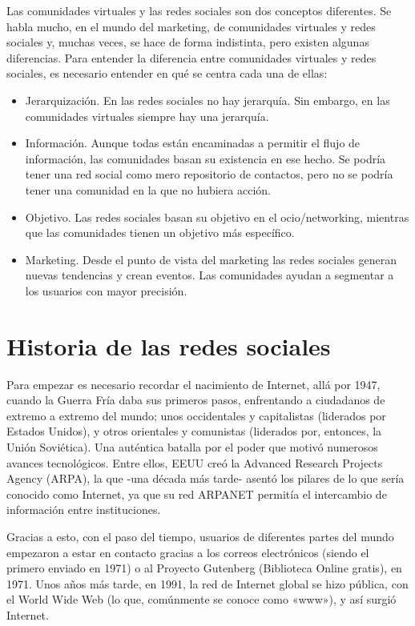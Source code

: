 Las comunidades virtuales y las redes sociales son dos conceptos diferentes. Se habla mucho, en el mundo del marketing, de comunidades virtuales y redes sociales y, muchas veces, se hace de forma indistinta, pero existen algunas diferencias. Para entender la diferencia entre comunidades virtuales y redes sociales,  es necesario entender en qué se centra cada una de ellas:
\begin{itemize}
    \item Jerarquización. En las redes sociales no hay jerarquía. Sin embargo, en las comunidades virtuales siempre hay una jerarquía.
    \item Información. Aunque todas están encaminadas a permitir el flujo de información, las comunidades basan su existencia en ese hecho. Se podría tener una red social como mero repositorio de contactos, pero no se podría tener una comunidad en la que no hubiera acción.
    \item Objetivo. Las redes sociales basan su objetivo en el ocio/networking, mientras que las comunidades tienen un objetivo más específico.
    \item Marketing. Desde el punto de vista del marketing las redes sociales generan nuevas tendencias y crean eventos. Las comunidades ayudan a segmentar a los usuarios con mayor precisión.
\end{itemize}

\section{Historia de las redes sociales}

Para empezar es necesario recordar el nacimiento de Internet, allá por 1947, cuando la Guerra Fría daba sus primeros pasos, enfrentando a ciudadanos de extremo a extremo del mundo; unos occidentales y capitalistas (liderados por Estados Unidos), y otros orientales y comunistas (liderados por, entonces, la Unión Soviética). Una auténtica batalla por el poder que motivó numerosos avances tecnológicos. Entre ellos, EEUU creó la Advanced Research Projects Agency (ARPA), la que -una década más tarde- asentó los pilares de lo que sería conocido como Internet, ya que su red ARPANET permitía el intercambio de información entre instituciones.

Gracias a esto, con el paso del tiempo, usuarios de diferentes partes del mundo empezaron a estar en contacto gracias a los correos electrónicos (siendo el primero enviado en 1971) o al Proyecto Gutenberg (Biblioteca Online gratis), en 1971. Unos años más tarde, en 1991, la red de Internet global se hizo pública, con el World Wide Web (lo que, comúnmente se conoce como «www»), y así surgió Internet.


